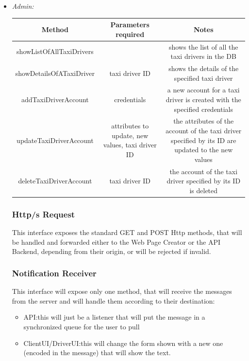 \documentclass{article}
\begin{document}
\begin{itemize}
\begin{table}[H]
\begin{adjustbox}{width=1.2\textwidth}
\begin{tabular}{*{3}{c}}
						\bottomrule
					\end{tabular}
				\end{adjustbox}
			\end{table}		
		\item \textit{Admin:} \\
			\begin{table}[H]
				\begin{adjustbox}{width=1.2\textwidth}	
					\begin{tabular}{*{3}{c}}
						\toprule
						Method & Parameters required & Notes \\
						\midrule
						showListOfAllTaxiDrivers & & shows the list of all the taxi drivers in the DB\\
						showDetailsOfATaxiDriver & taxi driver ID & shows the details of the specified taxi driver\\
						addTaxiDriverAccount & credentials & a new account for a taxi driver is created with the specified credentials\\ 
						updateTaxiDriverAccount & attributes to update, new values, taxi driver ID & the attributes of the account of the taxi driver specified by its ID are updated to the new values\\ 
						deleteTaxiDriverAccount & taxi driver ID & the account of the taxi driver specified by its ID is deleted\\
						\bottomrule
					\end{tabular}
				\end{adjustbox}	
			\end{table}	
			\subsubsection{Http/s Request} 
			This interface exposes the standard GET and POST Http methods, that will be handled and forwarded either to the Web Page Creator or the API Backend, depending from their origin, or will be rejected if invalid.
			\subsubsection{Notification Receiver}
			This interface will expose only one method, that will receive the messages from the server and will handle them according to their destination: 
			\begin{itemize}
				\item API:\@ this will just be a listener that will put the message in a synchronized queue for the user to pull
				\item ClientUI/DriverUI:\@ this will change the form shown with a new one (encoded in the message) that will show the text. 
			\end{itemize}


\end{itemize}
\end{document}
